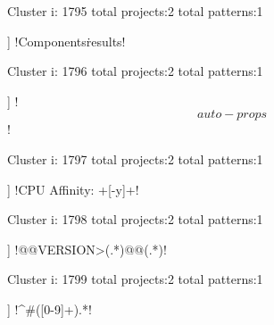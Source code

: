 Cluster i: 1795
total projects:2
total patterns:1
\begin{multicols}{1}
\begin{description}[noitemsep,topsep=0pt]
\item [[2] ] \cverb!Components\.results!
\end{description}
\end{multicols}







Cluster i: 1796
total projects:2
total patterns:1
\begin{multicols}{1}
\begin{description}[noitemsep,topsep=0pt]
\item [[2] ] \cverb!\s*\[auto-props\]!
\end{description}
\end{multicols}







Cluster i: 1797
total projects:2
total patterns:1
\begin{multicols}{1}
\begin{description}[noitemsep,topsep=0pt]
\item [[2] ] \cverb!CPU Affinity: +[-y]+!
\end{description}
\end{multicols}







Cluster i: 1798
total projects:2
total patterns:1
\begin{multicols}{1}
\begin{description}[noitemsep,topsep=0pt]
\item [[2] ] \cverb!@@VERSION>(.*)@@(.*)!
\end{description}
\end{multicols}







Cluster i: 1799
total projects:2
total patterns:1
\begin{multicols}{1}
\begin{description}[noitemsep,topsep=0pt]
\item [[2] ] \cverb!^\s*#\s*([0-9]+).*!
\end{description}
\end{multicols}







